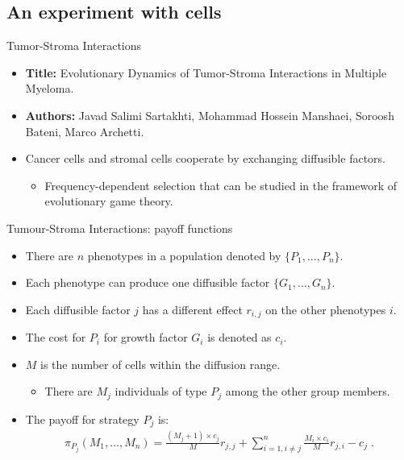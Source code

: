 \subsection{An experiment with cells}

\begin{frame}{Tumor-Stroma Interactions}

    \begin{itemize}
        \item \textbf{Title:} Evolutionary Dynamics of Tumor-Stroma Interactions in Multiple Myeloma.
        \item \textbf{Authors:} Javad Salimi Sartakhti, Mohammad Hossein Manshaei, Soroosh Bateni, Marco Archetti.
        \item Cancer cells and stromal cells cooperate by exchanging diffusible factors.
        \begin{itemize}
            \item Frequency-dependent selection that can be studied in the framework of evolutionary game theory.
        \end{itemize}
    \end{itemize}
    
\end{frame}

\begin{frame}{Tumour-Stroma Interactions: payoff functions}
    \begin{itemize}
        \item There are $n$ phenotypes in a population denoted by $\{ P_1, \ldots, P_n \}$.
        \item Each phenotype can produce one diffusible factor $\{ G_1, \ldots, G_n \}$.
        \item Each diffusible factor $j$ has a different effect $r_{i,j}$ on the other phenotypes $i$.
        \item The cost for $P_i$ for growth factor $G_i$ is denoted as $c_i$.
        \item $M$ is the number of cells within the diffusion range.
        \begin{itemize}
            \item There are $M_j$ individuals of type $P_j$ among the other group members.
        \end{itemize}
        \item The payoff for strategy $P_j$ is:
        \begin{align*}
            \pi_{P_j}(M_1,\ldots,M_n)=\frac{(M_j+1)\times c_j}{M}r_{j,j} + \sum_{i=1, i \neq j}^n \frac{M_i \times c_i}{M}r_{j,i} - c_j \;.
        \end{align*}
    \end{itemize}
\end{frame}

